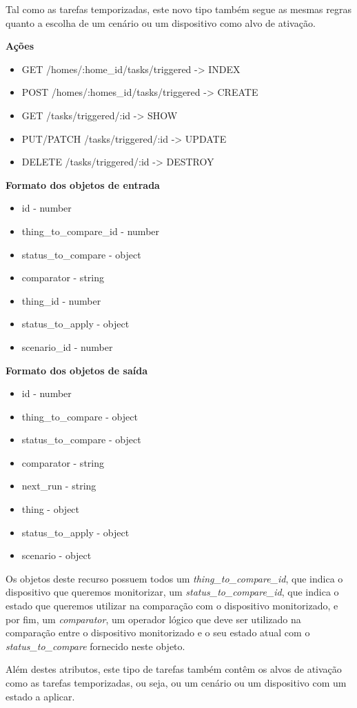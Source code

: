 Tal como as tarefas temporizadas, este novo tipo também segue as mesmas regras quanto a escolha de um cenário ou um dispositivo como alvo de ativação.

\textbf{Ações}
\begin{itemize}
    \item GET /homes/:home{\_}id/tasks/triggered -> INDEX
    \item POST /homes/:homes{\_}id/tasks/triggered -> CREATE
    \item GET /tasks/triggered/:id -> SHOW
    \item PUT/PATCH /tasks/triggered/:id -> UPDATE
    \item DELETE /tasks/triggered/:id -> DESTROY
\end{itemize}

\textbf{Formato dos objetos de entrada}
\begin{itemize}
    \item id - number
    \item thing{\_}to{\_}compare{\_}id - number
    \item status{\_}to{\_}compare - object
    \item comparator - string
    \item thing{\_}id - number 
    \item status{\_}to{\_}apply - object
    \item scenario{\_}id - number
\end{itemize}

\textbf{Formato dos objetos de saída}
\begin{itemize}
    \item id - number
    \item thing{\_}to{\_}compare - object
    \item status{\_}to{\_}compare - object
    \item comparator - string
    \item next{\_}run - string
    \item thing - object
    \item status{\_}to{\_}apply - object
    \item scenario - object
\end{itemize}

Os objetos deste recurso possuem todos um \textit{thing{\_}to{\_}compare{\_}id}, que indica o dispositivo que queremos monitorizar, um \textit{status{\_}to{\_}compare{\_}id}, que indica o estado que queremos utilizar na comparação com o dispositivo monitorizado, e por fim, um \textit{comparator}, um operador lógico que deve ser utilizado na comparação entre o dispositivo monitorizado e o seu estado atual com o \textit{status{\_}to{\_}compare} fornecido neste objeto.

Além destes atributos, este tipo de tarefas também contêm os alvos de ativação como as tarefas temporizadas, ou seja, ou um cenário ou um dispositivo com um estado a aplicar.

